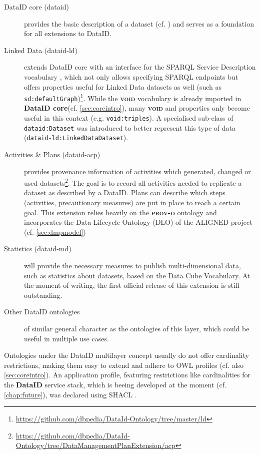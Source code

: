 \documentclass[a4paper,english,twoside,BCOR1.5cm,headsepline,DIV12,appendixprefix,final,12pt]{scrbook}
\newcommand{\dataid}{{\ttfamily\bfseries DataID}\xspace}
\newcommand{\core}{{\ttfamily\bfseries DataID core}\xspace}
\newcommand{\prov}{{\scshape\bfseries prov-o}\xspace}
\newcommand{\void}{{\scshape\bfseries void}\xspace}
\newcommand{\prop}[1]{{{\texttt{#1}}}}
\newcommand\footnoteurl[1]{\footnote{\scriptsize\url{#1}}}
\begin{document}
\begin{description}
\item[DataID core (dataid)] provides the basic description of a dataset (cf. ) and serves as a foundation for all extensions to DataID.
\item[Linked Data (dataid-ld)] extends DataID core with an interface for the SPARQL Service Description vocabulary \cite{sparqlsd}, which not only allows specifying SPARQL endpoints but offers properties useful for Linked Data datasets as well (such as \prop{sd:defaultGraph})\footnoteurl{https://github.com/dbpedia/DataId-Ontology/tree/master/ld}. While the \void vocabulary is already imported in \core (cf. \cref{sec:coreintro}), many \void and properties only become useful in this context (e.g. \prop{void:triples}). A specialised sub-class of \prop{dataid:Dataset} was introduced to better represent this type of data (\prop{dataid-ld:LinkedDataDataset}).
\item[Activities \& Plans (dataid-acp)] provides provenance information of activities which generated, changed or used datasets\footnoteurl{https://github.com/dbpedia/DataId-Ontology/tree/DataManagementPlanExtension/acp}. The goal is to record all activities needed to replicate a dataset as described by a DataID. Plans can describe which steps (activities, precautionary measures) are put in place to reach a certain goal. This extension relies heavily on the \prov ontology\cite{prov} and incorporates the Data Lifecycle Ontology (DLO) of the ALIGNED project (cf. \cref{sec:dmpmodel})
\item[Statistics (dataid-md)] will provide the necessary measures to publish multi-dimensional data, such as statistics about datasets, based on the Data Cube Vocabulary\cite{datacube}. At the moment of writing, the first official release of this extension is still outstanding.
\item[Other DataID ontologies] of similar general character as the ontologies of this layer, which could be useful in multiple use cases.
\end{description}

Ontologies under the DataID multilayer concept usually do not offer cardinality restrictions, making them easy to extend and adhere to OWL profiles (cf. also \cref{sec:coreintro}). An application profile, featuring restrictions like cardinalities for the \dataid service stack, which is beeing developed at the moment (cf. \cref{chap:future}), was declared using SHACL \cite{shacl}.
\end{document}
